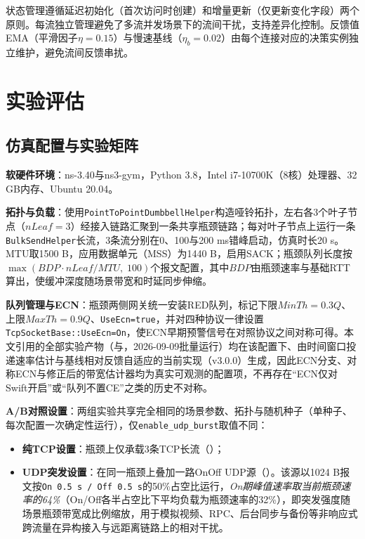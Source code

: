 \documentclass[10pt,twocolumn]{article}
\begin{document}
状态管理遵循延迟初始化（首次访问时创建）和增量更新（仅更新变化字段）两个原则。每流独立管理避免了多流并发场景下的流间干扰，支持差异化控制。反馈值EMA（平滑因子$\eta=0.15$）与慢速基线（$\eta_b=0.02$）由每个连接对应的决策实例独立维护，避免流间反馈串扰。


\section{实验评估}

\subsection{仿真配置与实验矩阵}
\label{subsec:setup}

\textbf{软硬件环境}：ns-3.40\cite{ns3}与ns3-gym\cite{opengym}，Python 3.8，Intel i7-10700K（8核）处理器、32 GB内存、Ubuntu 20.04。

\textbf{拓扑与负载}：使用\texttt{PointToPointDumbbellHelper}构造哑铃拓扑，左右各3个叶子节点（$nLeaf=3$）经接入链路汇聚到一条共享瓶颈链路；每对叶子节点上运行一条\texttt{BulkSendHelper}长流，3条流分别在0、100与200 ms错峰启动，仿真时长20 s。MTU取1500 B，应用数据单元（MSS）为1440 B，启用SACK；瓶颈队列长度按$\max(BDP \cdot nLeaf / MTU, \; 100)$个报文配置，其中$BDP$由瓶颈速率与基础RTT算出，使缓冲深度随场景带宽和时延同步伸缩。

\textbf{队列管理与ECN}：瓶颈两侧网关统一安装RED队列，标记下限$MinTh = 0.3Q$、上限$MaxTh = 0.9Q$、\texttt{UseEcn=true}，并对四种协议一律设置\texttt{TcpSocketBase::UseEcn=On}，使ECN早期预警信号在对照协议之间对称可得。本文引用的全部实验产物（与，2026-09-09批量运行）均在该配置下、由时间窗口投递速率估计与基线相对反馈自适应的当前实现（v3.0.0）生成，因此ECN分支、对称ECN与修正后的带宽估计器均为真实可观测的配置项，不再存在“ECN仅对Swift开启”或“队列不置CE”之类的历史不对称。

\textbf{A/B对照设置}：两组实验共享完全相同的场景参数、拓扑与随机种子（单种子、每次配置一次确定性运行），仅\texttt{enable\_udp\_burst}取值不同：
\begin{itemize}
\item \textbf{纯TCP设置}：瓶颈上仅承载3条TCP长流（）；
\item \textbf{UDP突发设置}：在同一瓶颈上叠加一路OnOff UDP源（）。该源以1024 B报文按\texttt{On 0.5 s / Off 0.5 s}的50\%占空比运行，\emph{On期峰值速率取当前瓶颈速率的64\%}（On/Off各半占空比下平均负载为瓶颈速率的32\%），即突发强度随场景瓶颈带宽成比例缩放，用于模拟视频、RPC、后台同步与备份等非响应式跨流量在异构接入与远距离链路上的相对干扰。
\end{itemize}
\end{document}
